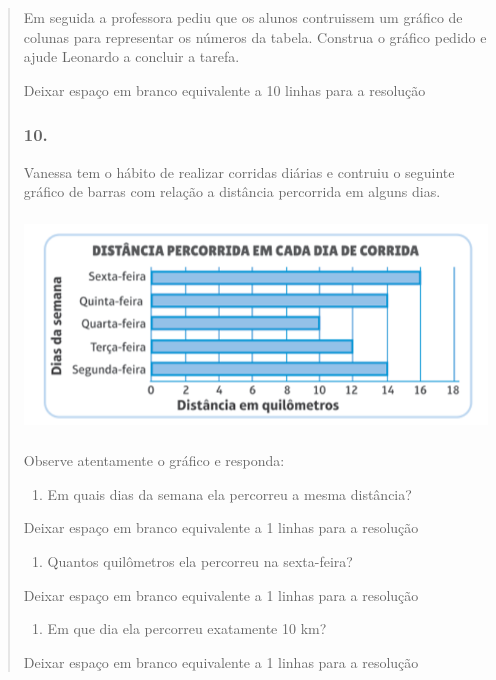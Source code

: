 \begin{enumerate}
\begin{escolha}
\begin{enumerate}
\begin{itemize}
\begin{itemize}
\begin{escolha}
\begin{quote}
\begin{escolha}
{Em seguida a professora pediu que os alunos contruissem um gráfico de
colunas para representar os números da tabela. Construa o gráfico pedido
e ajude Leonardo a concluir a tarefa.

Deixar espaço em branco equivalente a 10 linhas para a resolução

\subsubsection{10.}\label{section-100}

Vanessa tem o hábito de realizar corridas diárias e contruiu o seguinte
gráfico de barras com relação a distância percorrida em alguns dias.

\includegraphics[width=5.22545in,height=2.25853in]{media/image103.png}

Observe atentamente o gráfico e responda:

\begin{enumerate}
\def\labelenumi{\alph{enumi})}
\item
  Em quais dias da semana ela percorreu a mesma distância?
\end{enumerate}

Deixar espaço em branco equivalente a 1 linhas para a resolução

\begin{enumerate}
\def\labelenumi{\alph{enumi})}
\item
  Quantos quilômetros ela percorreu na sexta-feira?
\end{enumerate}

Deixar espaço em branco equivalente a 1 linhas para a resolução

\begin{enumerate}
\def\labelenumi{\alph{enumi})}
\item
  Em que dia ela percorreu exatamente 10 km?
\end{enumerate}

Deixar espaço em branco equivalente a 1 linhas para a resolução

}
\end{escolha}
\end{quote}
\end{escolha}
\end{itemize}
\end{itemize}
\end{enumerate}
\end{escolha}
\end{enumerate}
